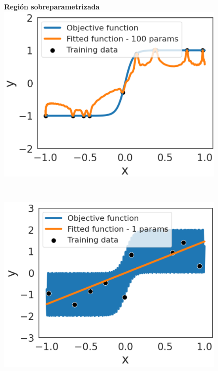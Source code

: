 \begin{figure}[h]
\begin{minipage}{0.32\textwidth}
    \end{minipage}
    \begin{minipage}{0.32\textwidth}
        \centering
        \textbf{Región sobreparametrizada} \\[0.5ex] 
        \includegraphics[width=\linewidth]{img/experiments/hiperbolica_noiseless1.3.png}
    \end{minipage} \\
    \begin{minipage}{0.32\textwidth}
        \centering
        \includegraphics[width=\linewidth]{img/experiments/hiperbolica_noise1.1.png}
    \end{minipage}

\end{figure}

